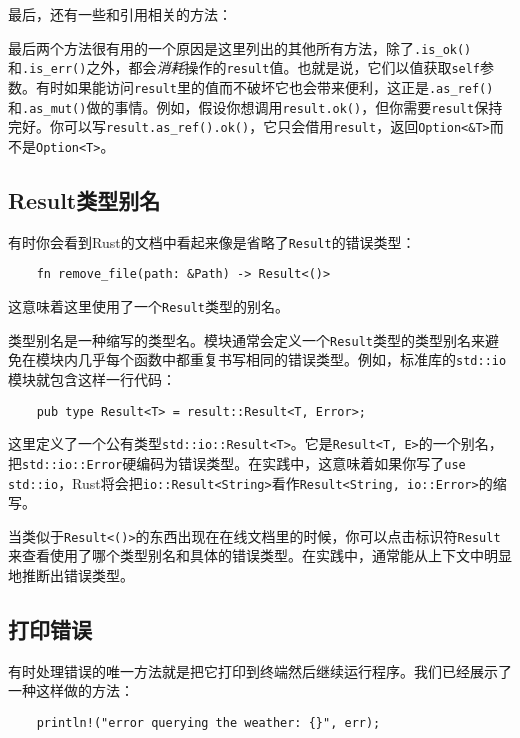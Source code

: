
最后，还有一些和引用相关的方法：


最后两个方法很有用的一个原因是这里列出的其他所有方法，除了\texttt{.is\_ok()}和\texttt{.is\_err()}之外，都会\emph{消耗}操作的\texttt{result}值。也就是说，它们以值获取\texttt{self}参数。有时如果能访问\texttt{result}里的值而不破坏它也会带来便利，这正是\texttt{.as\_ref()}和\texttt{.as\_mut()}做的事情。例如，假设你想调用\texttt{result.ok()}，但你需要\texttt{result}保持完好。你可以写\texttt{result.as\_ref().ok()}，它只会借用\texttt{result}，返回\texttt{Option<\&T>}而不是\texttt{Option<T>}。

\subsection{Result类型别名}
有时你会看到Rust的文档中看起来像是省略了\texttt{Result}的错误类型：
\begin{verbatim}
    fn remove_file(path: &Path) -> Result<()>
\end{verbatim}
这意味着这里使用了一个\texttt{Result}类型的别名。

类型别名是一种缩写的类型名。模块通常会定义一个\texttt{Result}类型的类型别名来避免在模块内几乎每个函数中都重复书写相同的错误类型。例如，标准库的\texttt{std::io}模块就包含这样一行代码：
\begin{verbatim}
    pub type Result<T> = result::Result<T, Error>;
\end{verbatim}

这里定义了一个公有类型\texttt{std::io::Result<T>}。它是\texttt{Result<T, E>}的一个别名，把\texttt{std::io::Error}硬编码为错误类型。在实践中，这意味着如果你写了\texttt{use std::io}，Rust将会把\texttt{io::Result<String>}看作\texttt{Result<String, io::Error>}的缩写。

当类似于\texttt{Result<()>}的东西出现在在线文档里的时候，你可以点击标识符\texttt{Result}来查看使用了哪个类型别名和具体的错误类型。在实践中，通常能从上下文中明显地推断出错误类型。

\subsection{打印错误}
有时处理错误的唯一方法就是把它打印到终端然后继续运行程序。我们已经展示了一种这样做的方法：
\begin{verbatim}
    println!("error querying the weather: {}", err);
\end{verbatim}

